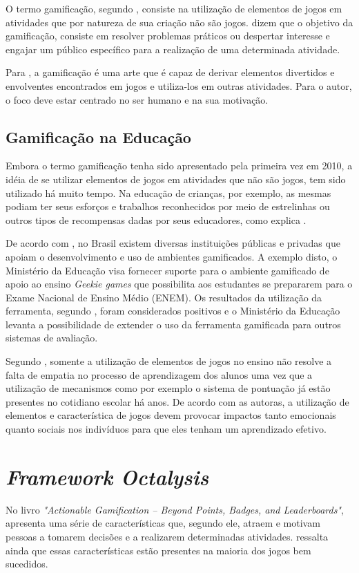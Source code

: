 O termo gamificação, segundo , consiste na utilização de elementos de jogos em 
atividades que por natureza de sua criação não são jogos.  dizem que o objetivo da gamificação, consiste em resolver
problemas práticos ou despertar interesse e engajar um público específico para a realização de uma determinada
atividade. 

Para , a gamificação é uma arte que é capaz de derivar elementos divertidos e envolventes encontrados em jogos e utiliza-los
em outras atividades. Para o autor, o foco deve estar centrado no ser humano e na sua motivação.

\subsection{Gamificação na Educação}
Embora o termo gamificação tenha sido apresentado pela primeira vez em 2010, a idéia de se utilizar
elementos de jogos em atividades que não são jogos, tem sido utilizado há muito tempo. Na educação
de crianças, por exemplo, as mesmas podiam ter seus esforços e trabalhos reconhecidos por meio
de estrelinhas ou outros tipos de recompensas dadas por seus educadores, como explica .

De acordo com , no Brasil existem diversas instituições públicas e privadas que apoiam o desenvolvimento e uso de ambientes
gamificados. A exemplo disto, o Ministério da Educação visa fornecer suporte para o ambiente gamificado de apoio ao ensino \textit{Geekie games} que possibilita
aos estudantes se prepararem para o Exame Nacional de Ensino Médio (ENEM). Os resultados da utilização da ferramenta, segundo , 
foram considerados positivos e o Ministério da Educação levanta a possibilidade de extender o uso da ferramenta gamificada para outros sistemas de avaliação.

Segundo , somente a utilização de elementos de jogos no ensino não resolve a falta de empatia no processo de aprendizagem dos alunos
uma vez que a utilização de mecanismos como por exemplo o sistema de pontuação já estão presentes no cotidiano escolar há anos. De acordo com as autoras, 
a utilização de elementos e característica de jogos devem provocar impactos tanto emocionais quanto sociais nos indivíduos para que eles tenham um aprendizado
efetivo. 


\section{\textit{Framework Octalysis}}
No livro \textit{"Actionable Gamification – Beyond Points, Badges, and Leaderboards"},  apresenta uma série
de características que, segundo ele, atraem e motivam pessoas a tomarem decisões e a realizarem determinadas atividades.
 ressalta ainda que essas características estão presentes na maioria dos jogos bem sucedidos.

